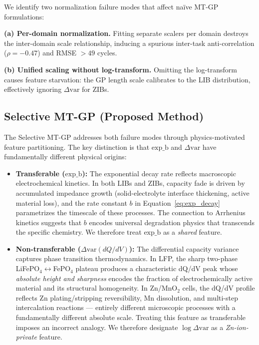 \documentclass[12pt]{article}
\begin{document}
We identify two normalization failure modes that affect na\"ive MT-GP formulations:

\textbf{(a) Per-domain normalization.} Fitting separate scalers per domain destroys the inter-domain scale relationship, inducing a spurious inter-task anti-correlation ($\rho = -0.47$) and RMSE $> 49$ cycles.

\textbf{(b) Unified scaling without log-transform.} Omitting the log-transform causes feature starvation: the GP length scale calibrates to the LIB distribution, effectively ignoring $\Delta\mathrm{var}$ for ZIBs.

\subsection{Selective MT-GP (Proposed Method)}

The Selective MT-GP addresses both failure modes through physics-motivated
feature partitioning. The key distinction is that $\text{exp\_b}$ and
$\Delta\mathrm{var}$ have fundamentally different physical origins:

\begin{itemize}
  \item \textbf{Transferable ($\text{exp\_b}$):} The exponential decay rate
  reflects macroscopic electrochemical kinetics. In both LIBs and ZIBs,
  capacity fade is driven by accumulated impedance growth (solid-electrolyte
  interface thickening, active material loss), and the rate constant $b$ in
  Equation~\eqref{eq:exp_decay} parametrizes the timescale of these processes.
  The connection to Arrhenius kinetics suggests that $b$ encodes universal
  degradation physics that transcends the specific chemistry. We therefore
  treat $\text{exp\_b}$ as a \emph{shared} feature.

  \item \textbf{Non-transferable ($\Delta\mathrm{var}(dQ/dV)$):} The
  differential capacity variance captures phase transition thermodynamics.
  In LFP, the sharp two-phase LiFePO$_4\leftrightarrow$FePO$_4$ plateau
  produces a characteristic dQ/dV peak whose \emph{absolute height and
  sharpness} encodes the fraction of electrochemically active material and its structural
  homogeneity. In Zn/MnO$_2$ cells, the dQ/dV profile reflects Zn
  plating/stripping reversibility, Mn dissolution, and multi-step intercalation
  reactions --- entirely different microscopic processes with a fundamentally
  different absolute scale. Treating this feature as transferable imposes an
  incorrect analogy. We therefore designate $\log\Delta\mathrm{var}$ as a
  \emph{Zn-ion-private} feature.
\end{itemize}
\end{document}
